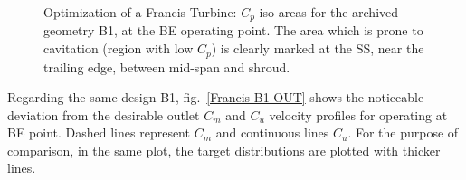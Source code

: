 \begin{figure}[h!]
\begin{minipage}[b]{1\linewidth}
 \centering
\end{minipage}
\caption{Optimization of a Francis Turbine: $C_p$ iso-areas for the archived geometry B1, at the BE operating point. The area which is prone to cavitation (region with low $C_p$) is clearly marked at the SS, near the trailing edge, between mid-span and shroud.}
\label{Francis-B1-BE}
\end{figure}

Regarding the same design  B1, fig.\ \ref{Francis-B1-OUT} shows the noticeable deviation from the desirable outlet $C_m$ and $C_u$ velocity profiles for operating at BE point.  Dashed lines represent $C_m$ and continuous lines $C_u$. For the purpose of comparison, in the same plot, the target distributions are plotted with thicker lines.   

